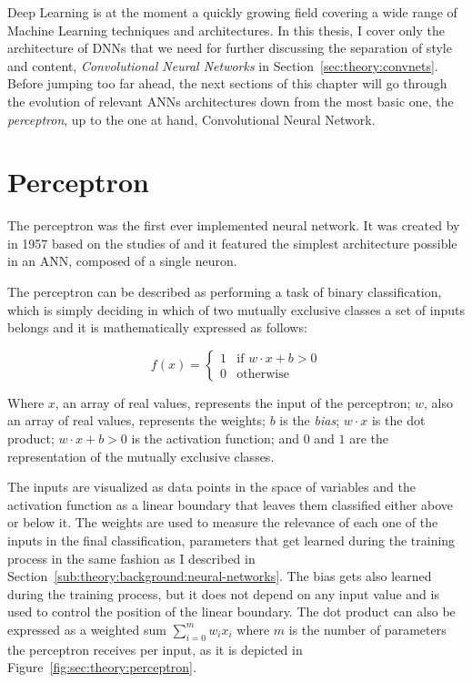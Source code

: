 Deep Learning is at the moment a quickly growing field covering a wide range of Machine Learning techniques and architectures.
In this thesis, I cover only the architecture of DNNs that we need for further discussing the separation of style and content, \emph{Convolutional Neural Networks} in Section~\ref{sec:theory:convnets}.
Before jumping too far ahead, the next sections of this chapter will go through the evolution of relevant ANNs architectures down from the most basic one, the \emph{perceptron}, up to the one at hand, Convolutional Neural Network.



\section{Perceptron}
\label{sec:theory:perceptron}

The perceptron was the first ever implemented neural network.
It was created by \citet{Rosenblatt1958} in 1957 based on the studies of \citet{McCulloch1943} and it featured the simplest architecture possible in an ANN, composed of a single neuron.

The perceptron can be described as performing a task of binary classification, which is simply deciding in which of two mutually exclusive classes a set of inputs belongs \cite{Freund1999} and it is mathematically expressed as follows:

$$
  f(x) =
  \begin{cases}
    1 & \text{if } {w}\cdot{x}+b > 0\\
    0 & \text{otherwise}
  \end{cases}
$$

Where $x$, an array of real values, represents the input of the perceptron; $w$, also an array of real values, represents the weights; $b$ is the \emph{bias}; ${w}\cdot{x}$ is the dot product; ${w}\cdot{x}+b > 0$ is the activation function; and $0$ and $1$ are the representation of the mutually exclusive classes.

The inputs are visualized as data points in the space of variables and the activation function as a linear boundary that leaves them classified either above or below it.
The weights are used to measure the relevance of each one of the inputs in the final classification, parameters that get learned during the training process in the same fashion as I described in Section~\ref{sub:theory:background:neural-networks}.
The bias gets also learned during the training process, but it does not depend on any input value and is used to control the position of the linear boundary.
The dot product can also be expressed as a weighted sum $\sum_{i=0}^{m} w_i x_i$ where $m$ is the number of parameters the perceptron receives per input, as it is depicted in Figure~\ref{fig:sec:theory:perceptron}.

